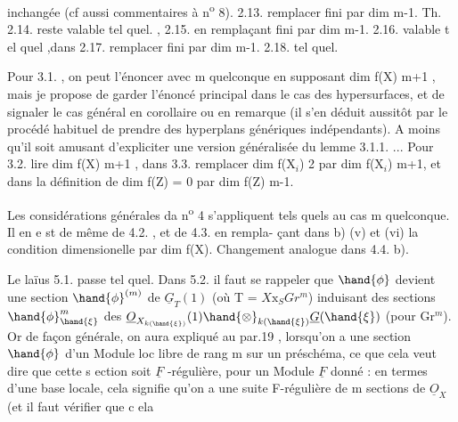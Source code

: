 
inchangée (cf aussi  commentaires à n\textsuperscript{o} 8). 2.13. remplacer fini
par dim \hand{$\leqslant$} m-1. Th. 2.14. reste valable tel quel. , 2.15. en
remplaçant fini par dim \hand{$\leqslant$} m-1. 2.16. valable t el quel ,dans
 2.17. remplacer fini par dim \hand{$\leqslant$} m-1. 2.18. tel quel.

Pour 3.1. , on peut l'énoncer avec m quelconque en supposant
dim f(X) \hand{$\geqslant$} m+1 , mais je propose de garder l'énoncé principal dans
le cas des hypersurfaces, et de signaler le cas général en corollaire
ou en remarque (il s'en déduit aussitôt par le procédé habituel de
prendre des hyperplans génériques indépendants). A moins qu'il soit
amusant d'expliciter une version généralisée du lemme 3.1.1. ...
Pour 3.2. lire dim f(X)\hand{$\geqslant$} m+1 , dans 3.3. remplacer dim f(X$_i$) \hand{$\geqslant$} 2
par dim f(X$_i$)\hand{$\geqslant$} m+1, et dans la définition de  dim f(Z) = 0
par dim f(Z) \hand{$\leqslant$} m-1.

Les considérations générales da n\textsuperscript{o} 4 s'appliquent tels quels
au cas m quelconque. Il en e st de même de 4.2. , et de 4.3. en rempla-%
çant dans b) (v) et (vi) la condition dimensionelle par
dim f(X). Changement analogue dans 4.4. b).

Le laïus 5.1. passe tel quel. Dans 5.2. il faut se rappeler
que $\hand{\phi}$ devient une section $\hand{\phi}^{(m)}$ de $\underline{G}_T(1)$ (où T 
 = $X\mathrm{x}_S Gr^m$)  induisant des sections
$\hand{\phi}^m_{\hand{\xi}}$ des   $\underline{O}_{X_{k(\hand{\xi})}}(1)\hand{\otimes}_{k(\hand{\xi})}\underline{G}(\hand{\xi})$ (pour \hand{$\xi \in$} Gr$^m$). Or
de façon générale, on aura expliqué au par.19 , lorsqu'on a une
 section $\hand{\phi}$ d'un Module loc libre de rang m sur un préschéma, ce que
cela veut dire que cette s ection soit $\underline{F}$ -régulière, pour un Module
$\underline{F}$ donné : en termes d'une base locale, cela signifie qu'on a une
suite F-régulière de m sections de $\underline{O}_X$ (et il faut vérifier que c ela

